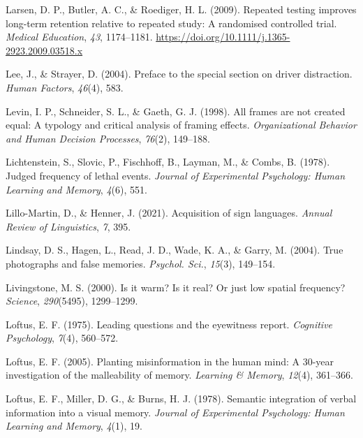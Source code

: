 \documentclass[
]{krantz}
\newlength{\cslhangindent}
\newlength{\cslentryspacingunit} %
\newenvironment{CSLReferences}[2] %
 {%
  \setlength{\parindent}{0pt}
  \ifodd #1
  \let\oldpar\par
  \def\par{\hangindent=\cslhangindent\oldpar}
  \fi
  \setlength{\parskip}{#2\cslentryspacingunit}
 }%
 {}
\begin{document}
\begin{CSLReferences}{1}{0}
\leavevmode{}%
Larsen, D. P., Butler, A. C., \& Roediger, H. L. (2009). Repeated testing improves long-term retention relative to repeated study: A randomised controlled trial. \emph{Medical Education}, \emph{43}, 1174--1181. \url{https://doi.org/10.1111/j.1365-2923.2009.03518.x}

\leavevmode{}%
Lee, J., \& Strayer, D. (2004). Preface to the special section on driver distraction. \emph{Human Factors}, \emph{46}(4), 583.

\leavevmode{}%
Levin, I. P., Schneider, S. L., \& Gaeth, G. J. (1998). All frames are not created equal: A typology and critical analysis of framing effects. \emph{Organizational Behavior and Human Decision Processes}, \emph{76}(2), 149--188.

\leavevmode{}%
Lichtenstein, S., Slovic, P., Fischhoff, B., Layman, M., \& Combs, B. (1978). Judged frequency of lethal events. \emph{Journal of Experimental Psychology: Human Learning and Memory}, \emph{4}(6), 551.

\leavevmode{}%
Lillo-Martin, D., \& Henner, J. (2021). Acquisition of sign languages. \emph{Annual Review of Linguistics}, \emph{7}, 395.

\leavevmode{}%
Lindsay, D. S., Hagen, L., Read, J. D., Wade, K. A., \& Garry, M. (2004). True photographs and false memories. \emph{Psychol. Sci.}, \emph{15}(3), 149--154.

\leavevmode{}%
Livingstone, M. S. (2000). Is it warm? Is it real? Or just low spatial frequency? \emph{Science}, \emph{290}(5495), 1299--1299.

\leavevmode{}%
Loftus, E. F. (1975). Leading questions and the eyewitness report. \emph{Cognitive Psychology}, \emph{7}(4), 560--572.

\leavevmode{}%
Loftus, E. F. (2005). Planting misinformation in the human mind: A 30-year investigation of the malleability of memory. \emph{Learning \& Memory}, \emph{12}(4), 361--366.

\leavevmode{}%
Loftus, E. F., Miller, D. G., \& Burns, H. J. (1978). Semantic integration of verbal information into a visual memory. \emph{Journal of Experimental Psychology: Human Learning and Memory}, \emph{4}(1), 19.


\end{CSLReferences}
\end{document}
